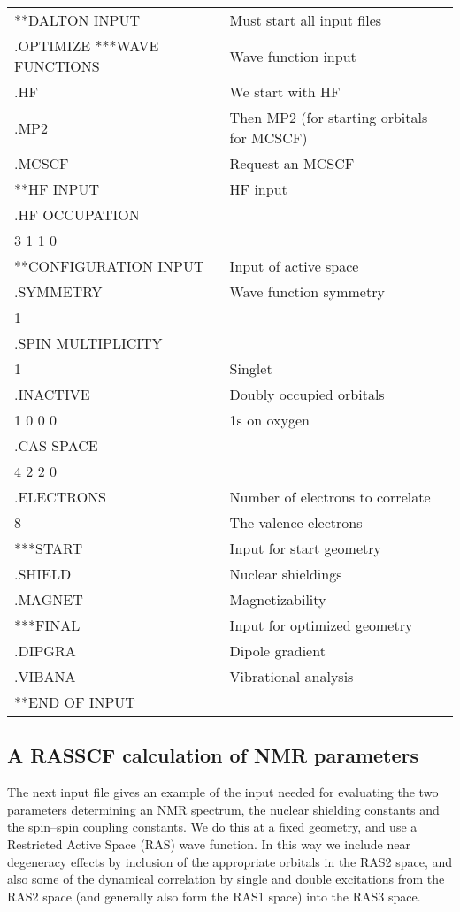 {\ttfamily
\begin{tabular}{ll}
**DALTON INPUT\hspace{4cm} & Must start all input files\\
.OPTIMIZE
***WAVE FUNCTIONS & Wave function input\\
.HF & We start with HF\\
.MP2 & Then MP2 (for starting orbitals for MCSCF)\\
.MCSCF & Request an MCSCF\\
**HF INPUT & HF input\\
.HF OCCUPATION\\
 3 1 1 0\\
**CONFIGURATION INPUT & Input of active space\\
.SYMMETRY & Wave function symmetry\\
 1\\
.SPIN MULTIPLICITY\\
 1 & Singlet\\
.INACTIVE & Doubly occupied orbitals\\
 1 0 0 0 & 1s on oxygen\\
.CAS SPACE\\
 4 2 2 0\\
.ELECTRONS & Number of electrons to correlate\\
 8 & The valence electrons\\
***START & Input for start geometry\\
.SHIELD & Nuclear shieldings\\
.MAGNET & Magnetizability\\
***FINAL & Input for optimized geometry\\
.DIPGRA & Dipole gradient\\
.VIBANA & Vibrational analysis\\
**END OF INPUT\\
\end{tabular}}

\subsection{A RASSCF calculation of NMR parameters}

The next input file gives an example of the input needed for
evaluating the two parameters determining an NMR spectrum, the nuclear
shielding constants and the spin--spin
coupling constants. We do this
at a fixed geometry, and use a Restricted Active Space (RAS) wave
function. In this way we include near degeneracy effects by inclusion
of the appropriate orbitals in the RAS2 space, and also some of the
dynamical correlation  by single and
double excitations
from the RAS2 space (and generally also form the RAS1 space) into the
RAS3 space.

